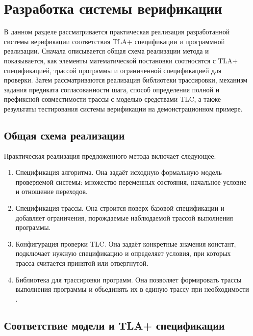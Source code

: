 \section{Разработка системы верификации}

В данном разделе рассматривается практическая реализация разработанной
системы верификации соответствия TLA+ спецификации и программной
реализации. Сначала описывается общая схема реализации метода и
показывается, как элементы математической постановки соотносятся с
TLA+ спецификацией, трассой программы и ограниченной спецификацией для
проверки. Затем рассматриваются реализация библиотеки трассировки,
механизм задания предиката согласованности шага, способ определения
полной и префиксной совместимости трассы с моделью средствами TLC, а
также результаты тестирования системы верификации на демонстрационном
примере.

\subsection{Общая схема реализации}

Практическая реализация предложенного метода включает следующее:

\begin{enumerate}
    \item Спецификация алгоритма.
    Она задаёт исходную формальную модель проверяемой системы: множество
переменных состояния, начальное условие и отношение переходов.

    \item Спецификация трассы.
    Она строится поверх базовой спецификации и добавляет ограничения,
порождаемые наблюдаемой трассой выполнения программы.

    \item Конфигурация проверки TLC.
    Она задаёт конкретные значения констант, подключает нужную спецификацию и
определяет условия, при которых трасса считается принятой или отвергнутой.

    \item Библиотека для трассировки программ.
    Она позволяет формировать трассы выполнения программы и объединять их в
единую трассу при необходимости \cite{tlacimpl}.
\end{enumerate}

\subsection{Соответствие модели и TLA+ спецификации}

